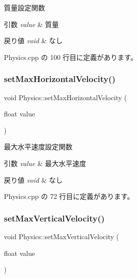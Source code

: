 質量設定関数 


\begin{DoxyParams}{引数}
{\em value} & 質量 \\
\hline
\end{DoxyParams}

\begin{DoxyRetVals}{戻り値}
{\em void} & なし \\
\hline
\end{DoxyRetVals}


 Physics.\+cpp の 100 行目に定義があります。

\mbox{\label{class_physics_a4e8108eeaa958c99543fe2ec3e21b240}} 
\subsubsection{\texorpdfstring{set\+Max\+Horizontal\+Velocity()}{setMaxHorizontalVelocity()}}
{\footnotesize\ttfamily void Physics\+::set\+Max\+Horizontal\+Velocity (\begin{DoxyParamCaption}\item[{float}]{value }\end{DoxyParamCaption})}



最大水平速度設定関数 


\begin{DoxyParams}{引数}
{\em value} & 最大水平速度 \\
\hline
\end{DoxyParams}

\begin{DoxyRetVals}{戻り値}
{\em void} & なし \\
\hline
\end{DoxyRetVals}


 Physics.\+cpp の 72 行目に定義があります。

\mbox{\label{class_physics_a6a96fd4d918235e89384320519eae0f5}} 
\subsubsection{\texorpdfstring{set\+Max\+Vertical\+Velocity()}{setMaxVerticalVelocity()}}
{\footnotesize\ttfamily void Physics\+::set\+Max\+Vertical\+Velocity (\begin{DoxyParamCaption}\item[{float}]{value }\end{DoxyParamCaption})}




